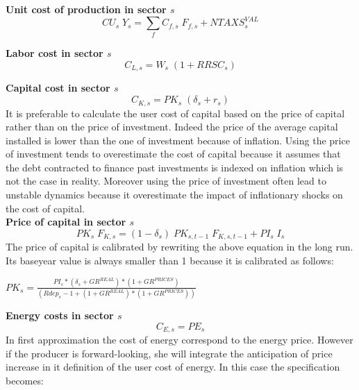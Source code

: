 \documentclass[12pt]{article}
\numberwithin{equation}{section}
\begin{document}
\noindent \textbf{Unit cost of production in sector $s$} 
\begin{dmath}
CU_{s} \; Y_{s} = \sum_{f} C_{f, s} \; F_{f, s} + NTAXS^{VAL}_{s}
\label{prices.mdlCU[s]}
\end{dmath}

\noindent \textbf{Labor cost in sector $s$} 
\begin{dmath}
C_{L, s} = W_{s} \; \left( 1 + RRSC_{s} \right)
\label{prices.mdlC[L, s]}
\end{dmath}


\noindent \textbf{Capital cost in sector $s$} 
\begin{dmath}
C_{K, s} = PK_{s} \; \left( \delta_{s} + r_{s} \right)
\label{prices.mdlC[K, s]}
\end{dmath}
It is preferable to calculate the user cost of capital based on the price of capital rather than on the price of investment. Indeed the price of the average capital installed is lower than the one of investment because of inflation. Using the price of investment tends to overestimate the cost of capital because it assumes that the debt contracted to finance past investments is indexed on inflation which is not the case in reality. Moreover using the price of investment often lead to unstable dynamics because it overestimate the impact of inflationary shocks on the cost of capital. \\


\noindent \textbf{Price of capital in sector $s$} 
\begin{dmath}
PK_{s} \; F_{K, s} = \left( 1 - \delta_{s} \right) \; PK_{s, t-1} \; F_{K, s, t-1} + PI_{s} \; I_{s}
\label{prices.mdlPK[s]}
\end{dmath}
The price of capital is calibrated by rewriting the above equation in the long run. Its baseyear value is always smaller than 1 because it is calibrated as follows: \begin{center} $PK_{s} = \frac{PI_{s}*(\delta_{s}+GR^{REAL})*(1+GR^{PRICES})}{(Rdep_{s}-1+(1+GR^{REAL})*(1+GR^{PRICES}))}$ \end{center}

\noindent \textbf{Energy costs in sector $s$} 
\begin{dmath}
C_{E, s} = PE_{s}
\label{prices.mdlC[E, s]}
\end{dmath}
In first approximation the cost of energy correspond to the energy price. However if the producer is forward-looking, she will integrate the anticipation of price increase in it definition of the user cost of energy. In this case the specification becomes: \\
\end{document}
